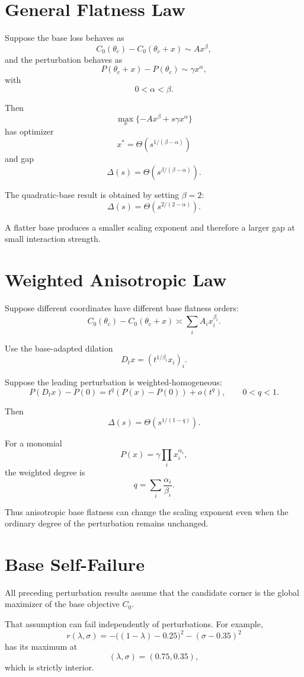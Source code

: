 \documentclass[11pt]{article}
\theoremstyle{remark}
\begin{document}
\section{General Flatness Law}

Suppose the base loss behaves as
\[
C_0(\theta_c)-C_0(\theta_c+x)
\sim A x^\beta,
\]
and the perturbation behaves as
\[
P(\theta_c+x)-P(\theta_c)
\sim \gamma x^\alpha,
\]
with
\[
0<\alpha<\beta.
\]

Then
\[
\max_x\{-Ax^\beta+s\gamma x^\alpha\}
\]
has optimizer
\[
x^*
=
\Theta\left(s^{1/(\beta-\alpha)}\right)
\]
and gap
\[
\boxed{
\Delta(s)
=
\Theta\left(s^{\beta/(\beta-\alpha)}\right).
}
\]

The quadratic-base result is obtained by setting $\beta=2$:
\[
\Delta(s)
=
\Theta\left(s^{2/(2-\alpha)}\right).
\]

A flatter base produces a smaller scaling exponent and therefore a larger gap at
small interaction strength.

\section{Weighted Anisotropic Law}

Suppose different coordinates have different base flatness orders:
\[
C_0(\theta_c)-C_0(\theta_c+x)
\asymp
\sum_i A_i x_i^{\beta_i}.
\]

Use the base-adapted dilation
\[
D_t x
=
\left(t^{1/\beta_i}x_i\right)_i.
\]

Suppose the leading perturbation is weighted-homogeneous:
\[
P(D_t x)-P(0)
=
t^q(P(x)-P(0))+o(t^q),
\qquad 0<q<1.
\]

Then
\[
\boxed{
\Delta(s)
=
\Theta\left(s^{1/(1-q)}\right).
}
\]

For a monomial
\[
P(x)=\gamma\prod_i x_i^{\alpha_i},
\]
the weighted degree is
\[
q=\sum_i\frac{\alpha_i}{\beta_i}.
\]

Thus anisotropic base flatness can change the scaling exponent even when the
ordinary degree of the perturbation remains unchanged.

\section{Base Self-Failure}

All preceding perturbation results assume that the candidate corner is the
global maximizer of the base objective $C_0$.

That assumption can fail independently of perturbations. For example,
\[
r(\lambda,\sigma)
=
-\bigl((1-\lambda)-0.25\bigr)^2
-(\sigma-0.35)^2
\]
has its maximum at
\[
(\lambda,\sigma)=(0.75,0.35),
\]
which is strictly interior.
\end{document}
